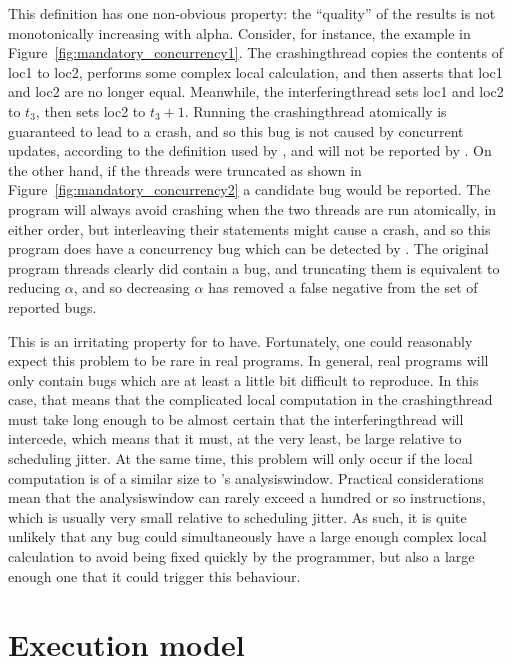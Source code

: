 This definition has one non-obvious property: the ``quality'' of the
results is not monotonically increasing with \gls{alpha}.  Consider,
for instance, the example in Figure~\ref{fig:mandatory_concurrency1}.
The \gls{crashingthread} copies the contents of loc1 to loc2, performs
some complex local calculation, and then asserts that loc1 and loc2
are no longer equal.  Meanwhile, the \gls{interferingthread} sets loc1
and loc2 to $t_3$, then sets loc2 to $t_3 + 1$.  Running the
\gls{crashingthread} atomically is guaranteed to lead to a crash, and
so this bug is not caused by concurrent updates, according to the
definition used by {\technique}, and will not be reported by
{\technique}.  On the other hand, if the threads were truncated as
shown in Figure~\ref{fig:mandatory_concurrency2} a candidate bug would
be reported.  The program will always avoid crashing when the two
threads are run atomically, in either order, but interleaving their
statements might cause a crash, and so this program does have a
concurrency bug which can be detected by {\technique}.  The original
program threads clearly did contain a bug, and truncating them is
equivalent to reducing $\alpha$, and so decreasing $\alpha$ has
removed a false negative from the set of reported bugs.

This is an irritating property for {\technique} to have.  Fortunately,
one could reasonably expect this problem to be rare in real programs.
In general, real programs will only contain bugs which are at least a
little bit difficult to reproduce.  In this case, that means that the
complicated local computation in the \gls{crashingthread} must take
long enough to be almost certain that the \gls{interferingthread} will
intercede, which means that it must, at the very least, be large
relative to scheduling jitter.  At the same time, this problem will
only occur if the local computation is of a similar size to
{\technique}'s \gls{analysiswindow}.  Practical considerations mean
that the \gls{analysiswindow} can rarely exceed a hundred or so
instructions, which is usually very small relative to scheduling
jitter.  As such, it is quite unlikely that any bug could
simultaneously have a large enough complex local calculation to avoid
being fixed quickly by the programmer, but also a large enough one
that it could trigger this behaviour.

\section{Execution model}

